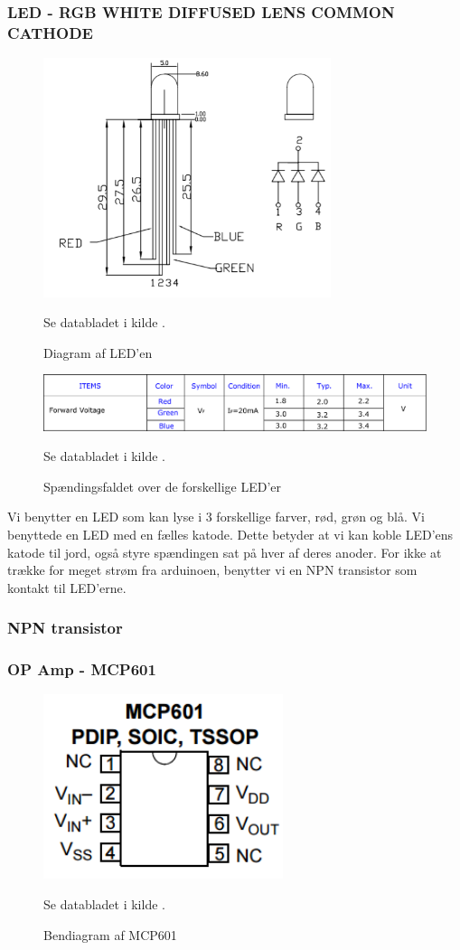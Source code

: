 \subsubsection{LED - RGB WHITE DIFFUSED LENS COMMON CATHODE}
\begin{figure}[H]
	\centering
    \includegraphics[height=7cm]{figures/komponenter/LED2}
	\caption{Diagram af LED'en}
	Se databladet i kilde \cite{kompRGBLED}.
\end{figure}
\begin{figure}[H]
	\centering
    \includegraphics[width=\textwidth]{figures/komponenter/LED}
	\caption{Spændingsfaldet over de forskellige LED'er}
	Se databladet i kilde \cite{kompRGBLED}.
\end{figure}
Vi benytter en LED som kan lyse i 3 forskellige farver, rød, grøn og blå. Vi benyttede en LED med en fælles katode. Dette betyder at vi kan koble LED'ens katode til jord, også styre spændingen sat på hver af deres anoder. For ikke at trække for meget strøm fra arduinoen, benytter vi en NPN transistor som kontakt til LED'erne.

\subsubsection{NPN transistor}

\subsubsection{OP Amp - MCP601}
\begin{figure}[H]
	\centering
    \includegraphics[width=7cm]{figures/komponenter/OPAMP}
	\caption{Bendiagram af MCP601}
	Se databladet i kilde \cite{kompOPAMP}.
\end{figure}

